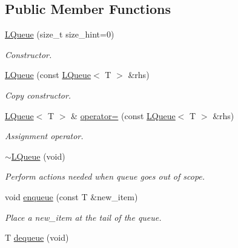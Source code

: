 \subsection*{Public Member Functions}
\begin{DoxyCompactItemize}
\item 
\hyperlink{classMadara_1_1Utility_1_1LQueue_a0b9c5bb0af453af874485f0a9af6fd13}{LQueue} (size\_\-t size\_\-hint=0)
\begin{DoxyCompactList}\small\item\em Constructor. \item\end{DoxyCompactList}\item 
\hyperlink{classMadara_1_1Utility_1_1LQueue_a38f8c4b3f9f0c48ccd0c12aacef7bbc0}{LQueue} (const \hyperlink{classMadara_1_1Utility_1_1LQueue}{LQueue}$<$ T $>$ \&rhs)
\begin{DoxyCompactList}\small\item\em Copy constructor. \item\end{DoxyCompactList}\item 
\hyperlink{classMadara_1_1Utility_1_1LQueue}{LQueue}$<$ T $>$ \& \hyperlink{classMadara_1_1Utility_1_1LQueue_a43f91565ac1ac18c7dfabc53dc205ee2}{operator=} (const \hyperlink{classMadara_1_1Utility_1_1LQueue}{LQueue}$<$ T $>$ \&rhs)
\begin{DoxyCompactList}\small\item\em Assignment operator. \item\end{DoxyCompactList}\item 
\hyperlink{classMadara_1_1Utility_1_1LQueue_a918cd612c238148314c7d448a2a9f658}{$\sim$LQueue} (void)
\begin{DoxyCompactList}\small\item\em Perform actions needed when queue goes out of scope. \item\end{DoxyCompactList}\item 
void \hyperlink{classMadara_1_1Utility_1_1LQueue_afd9783b06840c1cce56c6897c7ff87c6}{enqueue} (const T \&new\_\-item)
\begin{DoxyCompactList}\small\item\em Place a {\itshape new\_\-item\/} at the tail of the queue. \item\end{DoxyCompactList}\item 
T \hyperlink{classMadara_1_1Utility_1_1LQueue_aba114392d71b5bdbac52232e36cbf80b}{dequeue} (void)

\end{DoxyCompactItemize}
